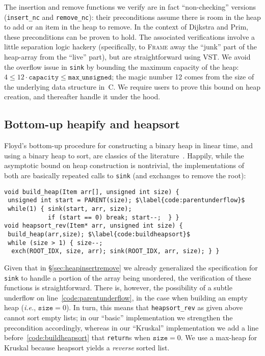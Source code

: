 The insertion and remove functions we verify are in fact ``non-checking'' versions (\texttt{insert\_nc} and \texttt{remove\_nc}): their preconditions assume there is room in the heap to add or an item in the heap to remove.  In the context of Dijkstra and Prim, these preconditions can be proven to hold.  The associated verifications involve a little separation logic hackery (specifically, to \textsc{Frame} away the ``junk'' part of the heap-array from the ``live'' part), but are straightforward using VST.  We avoid the overflow issue in \texttt{sink} by bounding the maximum capacity of the heap: $4 \le 12\cdot\texttt{capacity} \leq \texttt{max\_unsigned}$; the magic number 12 comes from the size of the underlying data structure in~C.  We require users to prove this bound on heap creation, and thereafter handle it under the hood.

\lstset{style=myTinyStyle}

\vspace*{-0.5em}
\subsection{Bottom-up heapify and heapsort}
\label{sec:heapsort}
\vspace*{-0.25em}

Floyd's bottom-up procedure for constructing a binary heap in linear time, and using a binary heap to sort, are classics of the literature~\cite{clrs,sedgewick}.
Happily, while the asymptotic bound on heap construction is nontrivial, the implementations of both are basically repeated calls to \texttt{sink} (and exchanges to remove the root):
\begin{lstlisting}[firstnumber=19]
void build_heap(Item arr[], unsigned int size) {
 unsigned int start = PARENT(size); $\label{code:parentunderflow}$
 while(1) { sink(start, arr, size);
            if (start == 0) break; start--;  } }
void heapsort_rev(Item* arr, unsigned int size) {
 build_heap(arr,size); $\label{code:buildheapsort}$
 while (size > 1) { size--;
  exch(ROOT_IDX, size, arr); sink(ROOT_IDX, arr, size); } }
\end{lstlisting}
Given that in \S\ref{sec:heapinsertremove} we already generalized the specification for \texttt{sink} to handle a portion of the array being unordered, the verification of these functions is straightforward.  There is, however, the possibility of a subtle underflow on line~\ref{code:parentunderflow}, in the case when building an empty heap (\emph{i.e.}, $\texttt{size}=0$).  In turn, this means that \texttt{heapsort\_rev} as given above cannot sort empty lists; in our ``basic'' implementation we strengthen the precondition accordingly, whereas in our ``Kruskal'' implementation we add a line before~\ref{code:buildheapsort} that \texttt{return}s when $\texttt{size}=0$.  We use a max-heap for Kruskal because heapsort yields a \emph{reverse} sorted list.

